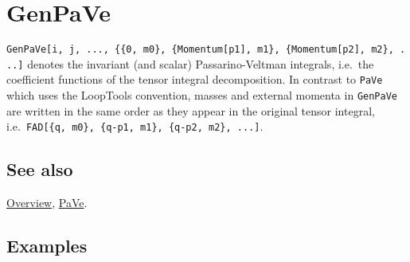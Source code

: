 \documentclass[../FeynCalcManual.tex]{subfiles}
\begin{document}
\hypertarget{genpave}{
\section{GenPaVe}\label{genpave}}

\texttt{GenPaVe[\allowbreak{}i,\ \allowbreak{}j,\ \allowbreak{}...,\ \allowbreak{}\{\allowbreak{}\{\allowbreak{}0,\ \allowbreak{}m0\},\ \allowbreak{}\{\allowbreak{}Momentum[\allowbreak{}p1],\ \allowbreak{}m1\},\ \allowbreak{}\{\allowbreak{}Momentum[\allowbreak{}p2],\ \allowbreak{}m2\},\ \allowbreak{}...]}
denotes the invariant (and scalar) Passarino-Veltman integrals, i.e.~the
coefficient functions of the tensor integral decomposition. In contrast
to \texttt{PaVe} which uses the LoopTools convention, masses and
external momenta in \texttt{GenPaVe} are written in the same order as
they appear in the original tensor integral,
i.e.~\texttt{FAD[\allowbreak{}\{\allowbreak{}q,\ \allowbreak{}m0\},\ \allowbreak{}\{\allowbreak{}q-p1,\ \allowbreak{}m1\},\ \allowbreak{}\{\allowbreak{}q-p2,\ \allowbreak{}m2\},\ \allowbreak{}...]}.

\subsection{See also}

\hyperlink{toc}{Overview}, \hyperlink{pave}{PaVe}.

\subsection{Examples}

\begin{Shaded}
\begin{Highlighting}[]
\OperatorTok{[}\OperatorTok{,} \SpecialCharTok{\textbackslash{}}\OperatorTok{[}\OperatorTok{]]}\OperatorTok{[}\OperatorTok{,} \SpecialCharTok{\textbackslash{}}\OperatorTok{[}\OperatorTok{]]}\OperatorTok{[\{}\OperatorTok{,}\OperatorTok{\},} \OperatorTok{\{} \SpecialCharTok{+}\OperatorTok{,}\OperatorTok{\},} \OperatorTok{\{} \SpecialCharTok{+}\OperatorTok{,}\OperatorTok{\}]}\SpecialCharTok{/}\NormalTok{(}\SpecialCharTok{*}\SpecialCharTok{\^{}}\NormalTok{) }
 
\OperatorTok{[}\SpecialCharTok{\%}\OperatorTok{,} \OperatorTok{,}\OtherTok{{-}\textgreater{}} \OperatorTok{]} 
 
\OperatorTok{[}\SpecialCharTok{\%\%}\OperatorTok{,} \OperatorTok{,}\OtherTok{{-}\textgreater{}} \OperatorTok{,}\OtherTok{{-}\textgreater{}} \OperatorTok{]}
\end{Highlighting}
\end{Shaded}
\end{document}
